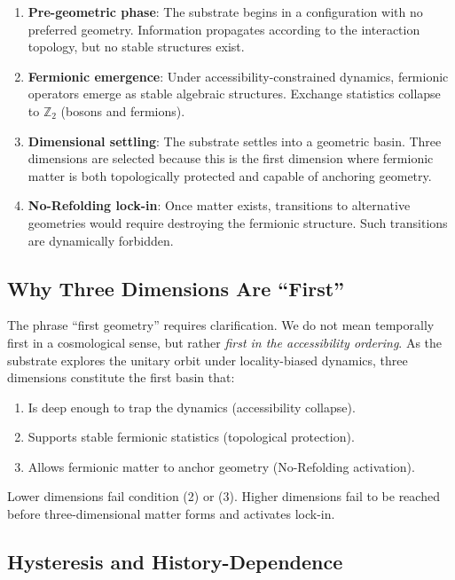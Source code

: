 \documentclass[11pt]{article}
\begin{document}
\begin{enumerate}
\item \textbf{Pre-geometric phase}: The substrate begins in a configuration with no preferred geometry. Information propagates according to the interaction topology, but no stable structures exist.

\item \textbf{Fermionic emergence}: Under accessibility-constrained dynamics, fermionic operators emerge as stable algebraic structures. Exchange statistics collapse to $\mathbb{Z}_2$ (bosons and fermions).

\item \textbf{Dimensional settling}: The substrate settles into a geometric basin. Three dimensions are selected because this is the first dimension where fermionic matter is both topologically protected and capable of anchoring geometry.

\item \textbf{No-Refolding lock-in}: Once matter exists, transitions to alternative geometries would require destroying the fermionic structure. Such transitions are dynamically forbidden.
\end{enumerate}

\subsection{Why Three Dimensions Are ``First''}

The phrase ``first geometry'' requires clarification. We do not mean temporally first in a cosmological sense, but rather \emph{first in the accessibility ordering}. As the substrate explores the unitary orbit under locality-biased dynamics, three dimensions constitute the first basin that:

\begin{enumerate}
\item Is deep enough to trap the dynamics (accessibility collapse).
\item Supports stable fermionic statistics (topological protection).
\item Allows fermionic matter to anchor geometry (No-Refolding activation).
\end{enumerate}

Lower dimensions fail condition (2) or (3). Higher dimensions fail to be reached before three-dimensional matter forms and activates lock-in.

\subsection{Hysteresis and History-Dependence}
\end{document}
